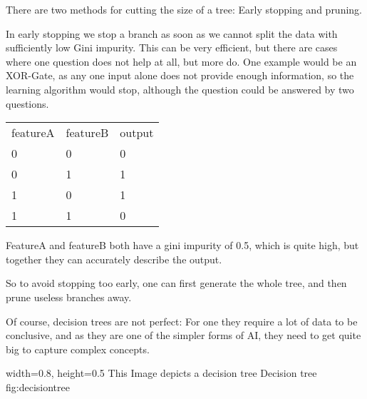There are two methods for cutting the size of a tree: Early stopping and pruning. 

In early stopping we stop a branch as soon as we cannot split the data with sufficiently low Gini impurity. This can be very efficient, but there are cases where one question does not help at all, but more do. One example would be an XOR-Gate, as any one input alone does not provide enough information, so the learning algorithm would stop, although the question could be answered by two questions.

\begin{tabular}{p{} p{} p{}}
    featureA & featureB & output\\
    0 & 0 & 0 \\
    0 & 1 & 1 \\
    1 & 0 & 1 \\
    1 & 1 & 0 \\
\end{tabular}

FeatureA and featureB both have a gini impurity of 0.5, which is quite high, but together they can accurately describe the output.

So to avoid stopping too early, one can first generate the whole tree, and then prune useless branches away.

Of course, decision trees are not perfect: For one they require a lot of data to be conclusive, and as they are one of the simpler forms of AI, they need to get quite big to capture complex concepts.



    {width=0.8\textwidth, height=0.5\textheight} %
    {This Image depicts a decision tree}   %
    {Decision tree}   %
    {fig:decisiontree}    %

 
